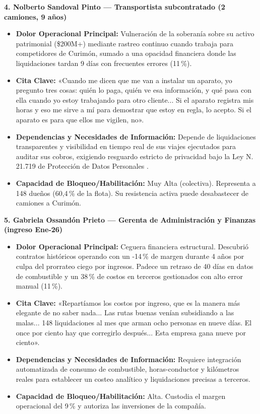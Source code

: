 \textbf{4. Nolberto Sandoval Pinto --- Transportista subcontratado (2 camiones, 9 años)}
\begin{itemize}
    \item \textbf{Dolor Operacional Principal:} Vulneración de la soberanía sobre su activo patrimonial (\$200M+) mediante rastreo continuo cuando trabaja para competidores de Curimón, sumado a una opacidad financiera donde las liquidaciones tardan 9 días con frecuentes errores (11\,\%).
    \item \textbf{Cita Clave:} «Cuando me dicen que me van a instalar un aparato, yo pregunto tres cosas: quién lo paga, quién ve esa información, y qué pasa con ella cuando yo estoy trabajando para otro cliente... Si el aparato registra mis horas y eso me sirve a mí para demostrar que estoy en regla, lo acepto. Si el aparato es para que ellos me vigilen, no».
    \item \textbf{Dependencias y Necesidades de Información:} Depende de liquidaciones transparentes y visibilidad en tiempo real de sus viajes ejecutados para auditar sus cobros, exigiendo resguardo estricto de privacidad bajo la Ley N.\textordmasculine{} 21.719 de Protección de Datos Personales \parencite{ley21719}.
    \item \textbf{Capacidad de Bloqueo/Habilitación:} Muy Alta (colectiva). Representa a 148 dueños (60,4\,\% de la flota). Su resistencia activa puede desabastecer de camiones a Curimón.
\end{itemize}

\textbf{5. Gabriela Ossandón Prieto --- Gerenta de Administración y Finanzas (ingreso Ene-26)}
\begin{itemize}
    \item \textbf{Dolor Operacional Principal:} Ceguera financiera estructural. Descubrió contratos históricos operando con un -14\,\% de margen durante 4 años por culpa del prorrateo ciego por ingresos. Padece un retraso de 40 días en datos de combustible y un 38\,\% de costos en terceros gestionados con alto error manual (11\,\%).
    \item \textbf{Cita Clave:} «Repartíamos los costos por ingreso, que es la manera más elegante de no saber nada... Las rutas buenas venían subsidiando a las malas... 148 liquidaciones al mes que arman ocho personas en nueve días. El once por ciento hay que corregirlo después... Esta empresa gana nueve por ciento».
    \item \textbf{Dependencias y Necesidades de Información:} Requiere integración automatizada de consumo de combustible, horas-conductor y kilómetros reales para establecer un costeo analítico y liquidaciones precisas a terceros.
    \item \textbf{Capacidad de Bloqueo/Habilitación:} Alta. Custodia el margen operacional del 9\,\% y autoriza las inversiones de la compañía.
\end{itemize}

